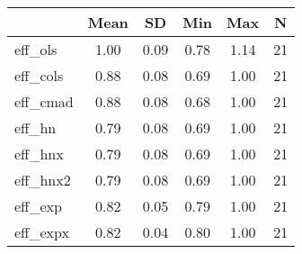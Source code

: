 {
\def\sym#1{\ifmmode^{#1}\else\(^{#1}\)\fi}
\begin{tabular}{l*{1}{ccccc}}
\hline\hline
                    &        Mean&          SD&         Min&         Max&           N\\
\hline
eff\_ols             &        1.00&        0.09&        0.78&        1.14&          21\\
eff\_cols            &        0.88&        0.08&        0.69&        1.00&          21\\
eff\_cmad            &        0.88&        0.08&        0.68&        1.00&          21\\
eff\_hn              &        0.79&        0.08&        0.69&        1.00&          21\\
eff\_hnx             &        0.79&        0.08&        0.69&        1.00&          21\\
eff\_hnx2            &        0.79&        0.08&        0.69&        1.00&          21\\
eff\_exp             &        0.82&        0.05&        0.79&        1.00&          21\\
eff\_expx            &        0.82&        0.04&        0.80&        1.00&          21\\
\hline\hline
\end{tabular}
}

